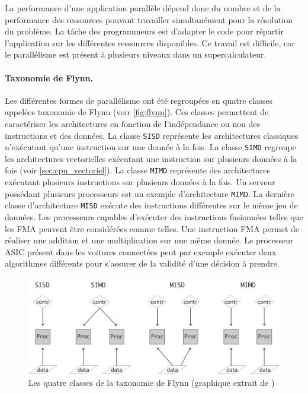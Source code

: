         La performance d'une application parallèle dépend donc du nombre et de la performance des ressources pouvant travailler simultanément pour la résolution du problème. La tâche des programmeurs est d'adapter le code pour répartir l'application sur les différentes ressources disponibles. Ce travail est difficile, car le parallélisme est présent à plusieurs niveaux dans un supercalculateur.
        
        
        \paragraph{Taxonomie de Flynn.}
             Les différentes formes de parallélisme ont été regroupées en quatre classes appelées taxonomie de Flynn \cite{Flynn2011} (voir \autoref{fig:flynn}). Ces classes permettent de caractériser les architectures en fonction de l'indépendance ou non des instructions et des données. La classe \verb=SISD= représente les architectures classiques n'exécutant qu'une instruction sur une donnée à la fois. 
            La classe \verb=SIMD= regroupe les architectures vectorielles exécutant une instruction sur plusieurs données à la fois (voir \autoref{sec:cpu_vectoriel}). La classe \verb|MIMD| représente des architectures exécutant plusieurs instructions sur plusieurs données à la fois. Un serveur possédant plusieurs processeurs est un exemple d'architecture \verb|MIMD|. La dernière classe d'architecture \verb|MISD| exécute des instructions différentes sur le même jeu de données. Les processeurs capables d'exécuter des instructions fusionnées telles que les FMA peuvent être considérées comme telles. Une instruction FMA permet de réaliser une addition et une multiplication sur une même donnée. Le processeur ASIC présent dans les voitures connectées peut par exemple exécuter deux algorithmes différents pour s'assurer de la validité d'une décision à prendre. 
            
            \begin{figure}
            \center
            \includegraphics[width=12cm]{images/flynn.png}
            \caption{\label{fig:flynn} Les quatre classes de la taxonomie de Flynn (graphique extrait de \cite{Eijkhout2013})}
            \end{figure}
            

